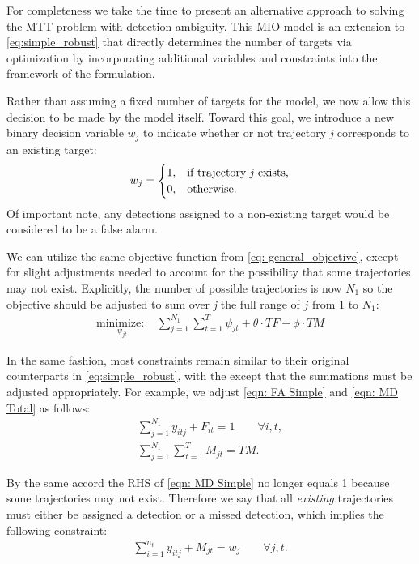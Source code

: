 For completeness we take the time to present an alternative approach to solving the MTT problem with detection ambiguity. This MIO model is an extension to \eqref{eq:simple_robust} that directly determines the number of targets via optimization by incorporating additional variables and constraints into the framework of the formulation. 

Rather than assuming a fixed number of targets for the model, we now allow this decision to be made by the model itself. Toward this goal, we introduce a new binary decision variable $w_{j}$ to indicate whether or not trajectory \textit{j} corresponds to an existing target:
\[w_{j} = 
\begin{cases}
1, & \text{if trajectory \textit{j} exists,}\\
0, & \text{otherwise.}
\end{cases}\]
Of important note, any detections assigned to a non-existing target would be considered to be a false alarm. 

We can utilize the same objective function from \eqref{eq: general_objective}, except for slight adjustments needed to account for the possibility that some trajectories may not exist. Explicitly, the number of possible trajectories is now $N_{1}$ so the objective should be adjusted to sum over \textit{j} the full range of $j$ from 1 to $N_{1}$:
\begin{align*}
\underset{\psi_{jt}}{\text{minimize: }} & \sum_{j=1}^{N_{1}} \sum_{t=1}^{T} \psi_{jt} + \theta \cdot TF + \phi \cdot TM
\end{align*}

In the same fashion, most constraints remain similar to their original counterparts in \eqref{eq:simple_robust}, with the except that the summations must be adjusted appropriately. For example, we adjust \eqref{eqn: FA Simple} and \eqref{eqn: MD Total} as follows: 
\begin{align*}
\sum_{j=1}^{N_{1}} y_{itj} + F_{it} = 1 \qquad \forall i,t,\\
\sum_{j=1}^{N_{1}} \sum_{t=1}^{T} M_{jt} = TM.
\end{align*}

By the same accord the RHS of \eqref{eqn: MD Simple} no longer equals 1 because some trajectories may not exist. Therefore we say that all \textit{existing} trajectories must either be assigned a detection or a missed detection, which implies the following constraint:
\begin{align}\label{eqn: Existing Targets}
\sum_{i=1}^{n_{t}} y_{itj} + M_{jt} = w_{j} \qquad \forall j,t.
\end{align}

